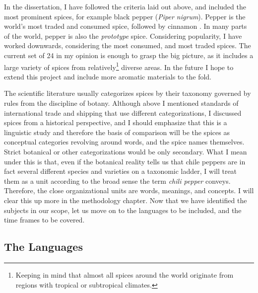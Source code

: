 
In the dissertation, I have followed the criteria laid out above, and included the most prominent spices, for example black pepper (\textit{Piper nigrum}). Pepper is the world's most traded and consumed spice, followed by cinnamon \autocite[16]{senaratne_cinnamon_2020}. In many parts of the world, pepper is also the \textit{prototype} spice. Considering popularity, I have worked downwards, considering the most consumed, and most traded spices. The current set of 24 in my opinion is enough to grasp the big picture, as it includes a large variety of spices from relatively\footnote{Keeping in mind that almost all spices around the world originate from regions with tropical or subtropical climates.} diverse areas. In the future I hope to extend this project and include more aromatic materials to the fold.

The scientific literature usually categorizes spices by their taxonomy governed by rules from the discipline of botany. Although above I mentioned standards of international trade and shipping that use different categorizations, I discussed spices from a historical perspective, and I should emphasize that this is a linguistic study and therefore the basis of comparison will be the spices as conceptual categories revolving around words, and the spice names themselves. Strict botanical or other categorizations would be only secondary. What I mean under this is that, even if the botanical reality tells us that chile peppers are in fact several different species and varieties on a taxonomic ladder, I will treat them as a unit according to the broad sense the term \textit{chili pepper} conveys. Therefore, the close organizational units are words, meanings, and concepts. I will clear this up more in the methodology chapter. Now that we have identified the subjects in our scope, let us move on to the languages to be included, and the time frames to be covered.


\subsection{The Languages}

